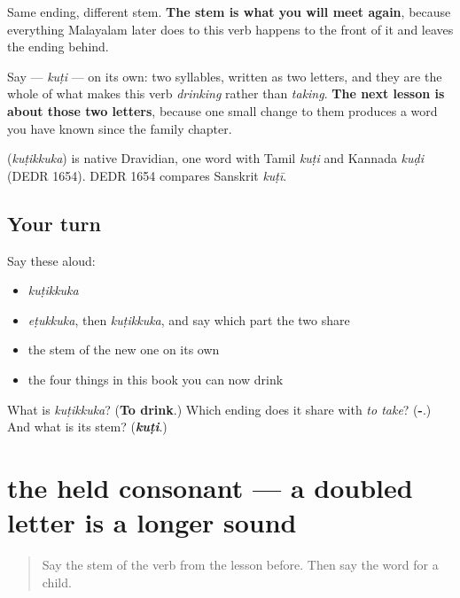 Same ending, different stem. \textbf{The stem is what you will meet again}, because everything Malayalam later does to this verb happens to the front of it and leaves the ending behind.

Say \textbf{} — \emph{kuṭi} — on its own: two syllables, written as two letters, and they are the whole of what makes this verb \emph{drinking} rather than \emph{taking}. \textbf{The next lesson is about those two letters}, because one small change to them produces a word you have known since the family chapter.

\begin{cousinweb}
\textbf{} (\emph{kuṭikkuka}) is native Dravidian, one word with Tamil \emph{kuṭi} and Kannada \emph{kuḍi} (DEDR 1654). DEDR 1654 compares Sanskrit \emph{kuṭī}.
\end{cousinweb}

\subsection*{Your turn}
Say these aloud:

\begin{itemize}
\raggedright
  \item \emph{kuṭikkuka}
  \item \emph{eṭukkuka}, then \emph{kuṭikkuka}, and say which part the two share
  \item the stem of the new one on its own
  \item the four things in this book you can now drink
\end{itemize}

\begin{tcolorbox}[breakable,colback=teal!4,colframe=teal!35!black,title={Before you move on}]
What is \emph{kuṭikkuka}? (\textbf{To drink}.) Which ending does it share with \emph{to take}? (\textbf{-}.) And what is its stem? (\emph{\textbf{kuṭi}}.)
\end{tcolorbox}
\section[the held consonant]{the held consonant — a doubled letter is a longer sound}

\label{lesson:ML-C85-gemination}



\begin{quote}
Say the stem of the verb from the lesson before. Then say the word for a child.
\end{quote}

